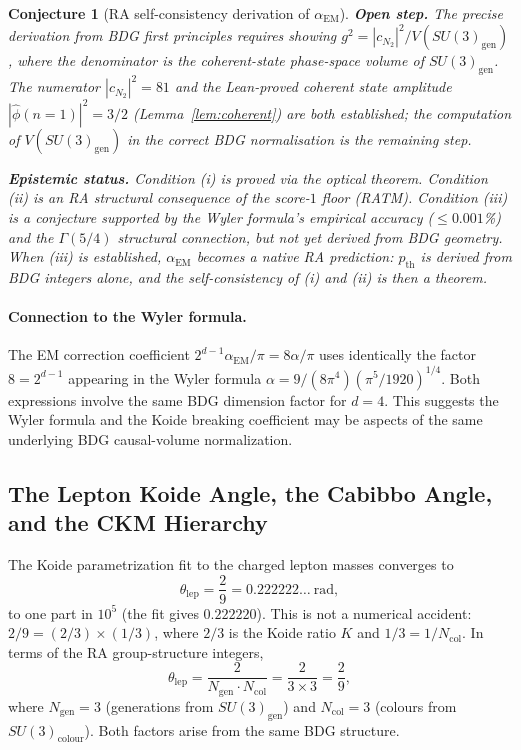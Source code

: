 \documentclass[11pt,a4paper]{article}
\newtheorem{conjecture}[theorem]{Conjecture}
\begin{document}
\begin{conjecture}[RA self-consistency derivation of $\alpha_{\mathrm{EM}}$]
\noindent
\textbf{Open step.}
The precise derivation from BDG first principles requires showing
$g^2 = |c_{N_2}|^2 / V(SU(3)_{\mathrm{gen}})$, where the denominator
is the coherent-state phase-space volume of $SU(3)_{\mathrm{gen}}$.
The numerator $|c_{N_2}|^2 = 81$ and the Lean-proved coherent state
amplitude $|\hat\phi(n{=}1)|^2 = 3/2$ (Lemma~\ref{lem:coherent})
are both established; the computation of $V(SU(3)_{\mathrm{gen}})$
in the correct BDG normalisation is the remaining step.

\noindent
\textbf{Epistemic status.}
Condition (i) is proved via the optical theorem.
Condition (ii) is an RA structural consequence of the score-$1$ floor (RATM).
Condition (iii) is a conjecture supported by the Wyler formula's
empirical accuracy ($\leq 0.001$\%) and the $\Gamma(5/4)$ structural
connection, but not yet derived from BDG geometry.
When (iii) is established, $\alpha_{\mathrm{EM}}$ becomes a native
RA prediction: $p_{\mathrm{th}}$ is derived from BDG integers alone,
and the self-consistency of (i) and (ii) is then a theorem.
\end{conjecture}


\paragraph{Connection to the Wyler formula.}
The EM correction coefficient $2^{d-1}\alpha_{\mathrm{EM}}/\pi = 8\alpha/\pi$
uses identically the factor $8 = 2^{d-1}$ appearing in the Wyler formula
$\alpha = 9/(8\pi^4)(\pi^5/1920)^{1/4}$. Both expressions involve the same
BDG dimension factor for $d=4$. This suggests the Wyler formula and the
Koide breaking coefficient may be aspects of the same underlying BDG
causal-volume normalization.

\subsection{The Lepton Koide Angle, the Cabibbo Angle, and the CKM Hierarchy}
\label{sec:ckm_koide}

The Koide parametrization fit to the charged lepton masses converges to
\begin{equation}
  \theta_{\mathrm{lep}} = \frac{2}{9} = 0.222222\ldots~\mathrm{rad},
  \label{eq:theta_lep_exact}
\end{equation}
to one part in $10^5$ (the fit gives $0.222220$). This is not a numerical
accident: $2/9 = (2/3) \times (1/3)$, where $2/3$ is the Koide ratio $K$
and $1/3 = 1/N_{\mathrm{col}}$. In terms of the RA group-structure integers,
\begin{equation}
  \theta_{\mathrm{lep}} = \frac{2}{N_{\mathrm{gen}}\cdot N_{\mathrm{col}}}
  = \frac{2}{3 \times 3} = \frac{2}{9},
  \label{eq:theta_group}
\end{equation}
where $N_{\mathrm{gen}} = 3$ (generations from $SU(3)_{\mathrm{gen}}$) and
$N_{\mathrm{col}} = 3$ (colours from $SU(3)_{\mathrm{colour}}$). Both factors
arise from the same BDG structure.
\end{document}

